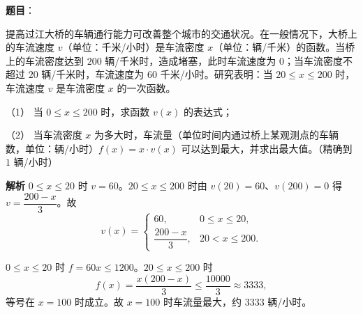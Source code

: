 \begin{answer}

\textbf{题目}：

提高过江大桥的车辆通行能力可改善整个城市的交通状况。在一般情况下，大桥上的车流速度 $v$（单位：千米/小时）是车流密度 $x$（单位：辆/千米）的函数。当桥上的车流密度达到 $200$ 辆/千米时，造成堵塞，此时车流速度为 $0$；当车流密度不超过 $20$ 辆/千米时，车流速度为 $60$ 千米/小时。研究表明：当 $20\leqslant x\leqslant200$ 时，车流速度 $v$ 是车流密度 $x$ 的一次函数。

（1） 当 $0\leqslant x\leqslant200$ 时，求函数 $v(x)$ 的表达式；

（2） 当车流密度 $x$ 为多大时，车流量（单位时间内通过桥上某观测点的车辆数，单位：辆/小时）$f(x)=x\cdot v(x)$ 可以达到最大，并求出最大值。（精确到 $1$ 辆/小时）

\textbf{解析}
$0\leqslant x\leqslant20$ 时 $v=60$。$20\leqslant x\leqslant200$ 时由 $v(20)=60$、$v(200)=0$ 得 $v=\dfrac{200-x}3$。故
\nopagebreak[4]
\[v(x)=\begin{cases}60,&0\leqslant x\leqslant20,\\[4pt]\dfrac{200-x}3,&20<x\leqslant200.\end{cases}\]

$0\leqslant x\leqslant20$ 时 $f=60x\leqslant1200$。$20\leqslant x\leqslant200$ 时
\nopagebreak[4]
\[f(x)=\frac{x(200-x)}3\leqslant\frac{10000}3\approx3333,\]
等号在 $x=100$ 时成立。故 $x=100$ 时车流量最大，约 $3333$ 辆/小时。



\end{answer}
